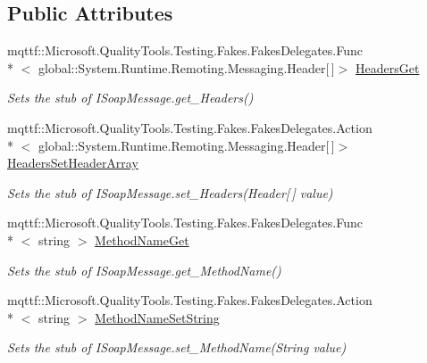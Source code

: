 \subsection*{Public Attributes}
\begin{DoxyCompactItemize}
\item 
mqttf\-::\-Microsoft.\-Quality\-Tools.\-Testing.\-Fakes.\-Fakes\-Delegates.\-Func\\*
$<$ global\-::\-System.\-Runtime.\-Remoting.\-Messaging.\-Header\mbox{[}$\,$\mbox{]}$>$ \hyperlink{class_system_1_1_runtime_1_1_serialization_1_1_formatters_1_1_fakes_1_1_stub_i_soap_message_a4e85735ff2bd64ecfbbf1bb359a6fb44}{Headers\-Get}
\begin{DoxyCompactList}\small\item\em Sets the stub of I\-Soap\-Message.\-get\-\_\-\-Headers()\end{DoxyCompactList}\item 
mqttf\-::\-Microsoft.\-Quality\-Tools.\-Testing.\-Fakes.\-Fakes\-Delegates.\-Action\\*
$<$ global\-::\-System.\-Runtime.\-Remoting.\-Messaging.\-Header\mbox{[}$\,$\mbox{]}$>$ \hyperlink{class_system_1_1_runtime_1_1_serialization_1_1_formatters_1_1_fakes_1_1_stub_i_soap_message_a6ead091454c42773b51d4652468d9f5a}{Headers\-Set\-Header\-Array}
\begin{DoxyCompactList}\small\item\em Sets the stub of I\-Soap\-Message.\-set\-\_\-\-Headers(\-Header\mbox{[}$\,$\mbox{]} value)\end{DoxyCompactList}\item 
mqttf\-::\-Microsoft.\-Quality\-Tools.\-Testing.\-Fakes.\-Fakes\-Delegates.\-Func\\*
$<$ string $>$ \hyperlink{class_system_1_1_runtime_1_1_serialization_1_1_formatters_1_1_fakes_1_1_stub_i_soap_message_a4ec3546e803b7c47f07794f61601fd71}{Method\-Name\-Get}
\begin{DoxyCompactList}\small\item\em Sets the stub of I\-Soap\-Message.\-get\-\_\-\-Method\-Name()\end{DoxyCompactList}\item 
mqttf\-::\-Microsoft.\-Quality\-Tools.\-Testing.\-Fakes.\-Fakes\-Delegates.\-Action\\*
$<$ string $>$ \hyperlink{class_system_1_1_runtime_1_1_serialization_1_1_formatters_1_1_fakes_1_1_stub_i_soap_message_a2d22d935754c4226dc574e3a3477cf4c}{Method\-Name\-Set\-String}
\begin{DoxyCompactList}\small\item\em Sets the stub of I\-Soap\-Message.\-set\-\_\-\-Method\-Name(\-String value)\end{DoxyCompactList}\item 

\end{DoxyCompactItemize}
